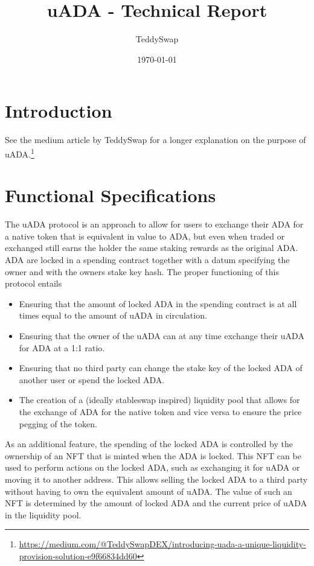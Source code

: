 \documentclass[11pt]{article}
\title{uADA - Technical Report}
\author{TeddySwap}
\date{\today}
\begin{document}
\maketitle

\section{Introduction}

See the medium article by TeddySwap for a longer explanation on the purpose of uADA.\footnote{\url{https://medium.com/@TeddySwapDEX/introducing-uada-a-unique-liquidity-provision-solution-e9f66834dd60}}


\section{Functional Specifications}

The uADA protocol is an approach to allow for users to exchange their ADA for a native token that is equivalent in value to ADA, but even when traded or exchanged
still earns the holder the same staking rewards as the original ADA.
ADA are locked in a spending contract together with a datum specifying the owner and with the owners stake key hash.
The proper functioning of this protocol entails

\begin{itemize}
    \item Ensuring that the amount of locked ADA in the spending contract is at all times equal to the amount of uADA in circulation.
    \item Ensuring that the owner of the uADA can at any time exchange their uADA for ADA at a 1:1 ratio.
    \item Ensuring that no third party can change the stake key of the locked ADA of another user or spend the locked ADA.
    \item The creation of a (ideally stableswap inspired) liquidity pool that allows for the exchange of ADA for the native token and vice versa to ensure the price pegging of the token.
\end{itemize}

As an additional feature, the spending of the locked ADA is controlled by the ownership of an NFT that is minted when the ADA is locked.
This NFT can be used to perform actions on the locked ADA, such as exchanging it for uADA or moving it to another address.
This allows selling the locked ADA to a third party without having to own the equivalent amount of uADA.
The value of such an NFT is determined by the amount of locked ADA and the current price of uADA in the liquidity pool.
\end{document}
